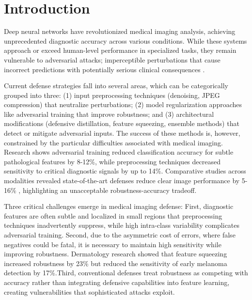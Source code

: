 \documentclass[preprint,12pt]{elsarticle}
\begin{document}


\section{Introduction}
\label{sec:introduction}

Deep neural networks have revolutionized medical imaging analysis, achieving unprecedented diagnostic accuracy across various conditions\cite{Mamo24}. While these systems approach or exceed human-level performance in specialized tasks, they remain vulnerable to adversarial attacks; imperceptible perturbations that cause incorrect predictions with potentially serious clinical consequences \cite{Bortsova21, Kaviani22}.

Current defense strategies fall into several areas, which can be categorically grouped into three: (1) input preprocessing techniques (denoising\cite{Chiang20}, JPEG compression\cite{Cheng21}) that neutralize perturbations; (2) model regularization approaches like adversarial training\cite{Muoka23} that improve robustness; and (3) architectural modifications (defensive distillation\cite{Qi24}, feature squeezing\cite{vasan2024}, ensemble methods\cite{Alzubaidi24}) that detect or mitigate adversarial inputs. The success of these methods is, however, constrained by the particular difficulties associated with medical imaging. Research shows adversarial training reduced classification accuracy for subtle pathological features by 8-12\%\cite{Sriramanan21}, while preprocessing techniques decreased sensitivity to critical diagnostic signals by up to 14\%\cite{Suganyadevi22}. Comparative studies across modalities revealed state-of-the-art defenses reduce clear image performance by 5-16\% \cite{Rodriguez22}, highlighting an unacceptable robustness-accuracy tradeoff.

Three critical challenges emerge in medical imaging defense: First, diagnostic features are often subtle and localized in small regions that preprocessing techniques inadvertently suppress\cite{Chiang20}, while high intra-class variability complicates adversarial training. Second, due to the asymmetric cost of errors, where false negatives could be fatal, it is necessary to maintain high sensitivity while improving robustness. Dermatology research showed that feature squeezing increased robustness by 23\% but reduced the sensitivity of early melanoma detection by 17\%\cite{Sahu24}.Third, conventional defenses treat robustness as competing with accuracy rather than integrating defensive capabilities into feature learning, creating vulnerabilities that sophisticated attacks exploit\cite{Sriramanan21}.
\end{document}
